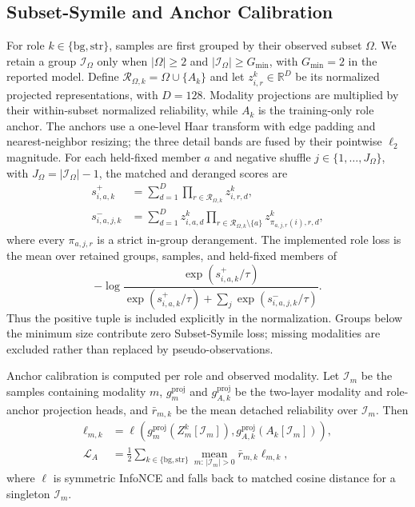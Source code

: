 \subsection{Subset-Symile and Anchor Calibration}
For role $k\in\{\mathrm{bg},\mathrm{str}\}$, samples are first grouped by their observed subset $\Omega$. We retain a group $\mathcal I_\Omega$ only when $|\Omega|\ge2$ and $|\mathcal I_\Omega|\ge G_{\min}$, with $G_{\min}=2$ in the reported model. Define $\mathcal R_{\Omega,k}=\Omega\cup\{A_k\}$ and let $z^k_{i,r}\in\mathbb R^D$ be its normalized projected representations, with $D=128$. Modality projections are multiplied by their within-subset normalized reliability, while $A_k$ is the training-only role anchor. The anchors use a one-level Haar transform with edge padding and nearest-neighbor resizing; the three detail bands are fused by their pointwise $\ell_2$ magnitude. For each held-fixed member $a$ and negative shuffle $j\in\{1,\ldots,J_\Omega\}$, with $J_\Omega=|\mathcal I_\Omega|-1$, the matched and deranged scores are
\begin{align}
s^+_{i,a,k}
&=\sum_{d=1}^{D}\prod_{r\in\mathcal R_{\Omega,k}} z^k_{i,r,d},\\
s^-_{i,a,j,k}
&=\sum_{d=1}^{D}z^k_{i,a,d}
\prod_{r\in\mathcal R_{\Omega,k}\setminus\{a\}}
z^k_{\pi_{a,j,r}(i),r,d},
\end{align}
where every $\pi_{a,j,r}$ is a strict in-group derangement. The implemented role loss is the mean over retained groups, samples, and held-fixed members of
\begin{equation}
-\log
\frac{\exp(s^+_{i,a,k}/\tau)}
{\exp(s^+_{i,a,k}/\tau)+\sum_j\exp(s^-_{i,a,j,k}/\tau)}.
\label{eq:subset-symile-detail}
\end{equation}
Thus the positive tuple is included explicitly in the normalization. Groups below the minimum size contribute zero Subset-Symile loss; missing modalities are excluded rather than replaced by pseudo-observations.

Anchor calibration is computed per role and observed modality. Let $\mathcal I_m$ be the samples containing modality $m$, $g_m^{\mathrm{proj}}$ and $g_{A,k}^{\mathrm{proj}}$ be the two-layer modality and role-anchor projection heads, and $\bar r_{m,k}$ be the mean detached reliability over $\mathcal I_m$. Then
\begin{align}
\ell_{m,k}
&=\ell\!\left(g_m^{\mathrm{proj}}(Z_m^k[\mathcal I_m]),
g_{A,k}^{\mathrm{proj}}(A_k[\mathcal I_m])\right),\\
\mathcal L_A
&=\frac{1}{2}\sum_{k\in\{\mathrm{bg},\mathrm{str}\}}
\operatorname*{mean}_{m:\,|\mathcal I_m|>0}
\bar r_{m,k}\ell_{m,k},
\end{align}
where $\ell$ is symmetric InfoNCE and falls back to matched cosine distance for a singleton $\mathcal I_m$.

